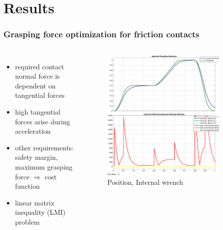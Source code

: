 \documentclass[student]{ITRslides}
\begin{document}
\section{Results}
\begin{frame}
	\frametitle{Grasping force optimization for friction contacts}
	\begin{columns}
	\begin{itemize}
	\item required contact normal force is dependent on tangential forces
	\item high tangential forces arise during acceleration
	\item other requirements: safety margin, maximum grasping force $\Rightarrow$ cost function
	\item linear matrix inequality (LMI) problem
	\end{itemize}

\begin{figure}[htb]
			\centering
			\includegraphics[width=0.9\textwidth]{Hanposforce.eps}
			\caption{Position, Internal wrench}
\end{figure}
\end{columns}
\end{frame}
\end{document}
